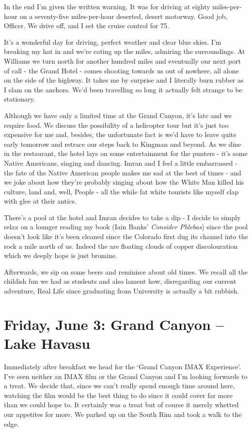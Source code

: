 \documentclass[a5paper,10pt,titlepage,draft]{book}
\begin{document}
In the end I'm given the written warning.  It was for driving at eighty miles-per-hour on a seventy-five miles-per-hour deserted, desert motorway.  Good job, Officer.  We drive off, and I set the cruise control for 75.

It's a wonderful day for driving, perfect weather and clear blue skies.  I'm breaking my hat in and we're eating up the miles, admiring the surroundings.  At Williams we turn north for another hundred miles and eventually our next port of call - the Grand Hotel - comes shooting towards us out of nowhere, all alone on the side of the highway.  It takes me by surprise and I literally burn rubber as I slam on the anchors.  We'd been travelling so long it actually felt strange to be stationary.

Although we have only a limited time at the Grand Canyon, it's late and we require food.  We discuss the possibility of a helicopter tour but it's just too expensive for me and, besides, the unfortunate fact is we'd have to leave quite early tomorrow and retrace our steps back to Kingman and beyond.  As we dine in the restaurant, the hotel lays on some entertainment for the punters - it's some Native Americans, singing and dancing.  Imran and I feel a little embarrassed - the fate of the Native American people makes me sad at the best of times - and we joke about how they're probably singing about how the White Man killed his culture, land and, well, People - all the while fat white tourists like myself clap with glee at their antics.

There's a pool at the hotel and Imran decides to take a dip - I decide to simply relax on a lounger reading my book (Iain Banks' \emph{Consider Phlebas}) since the pool doesn't look like it's been cleaned since the Colorado first dug its channel into the rock a mile north of us.  Indeed the are floating clouds of copper discolouration which we deeply hope is just bromine.

Afterwards, we sip on some beers and reminisce about old times.  We recall all the childish fun we had as students and also lament how, disregarding our current adventure, Real Life since graduating from University is actually a bit rubbish.

\chapter[Grand Canyon -- Lake Havasu]{Friday, June 3: Grand Canyon -- Lake Havasu}
Immediately after breakfast we head for the `Grand Canyon IMAX Experience'.  I've seen neither an IMAX film or the Grand Canyon and I'm looking forwards to a treat.  We decide that, since we can't really spend enough time around here, watching the film would be the best thing to do since it could cover far more than we could hope to. It certainly was a treat but of course it merely whetted our appetites for more.  We parked up on the South Rim and took a walk to the edge.
\end{document}
